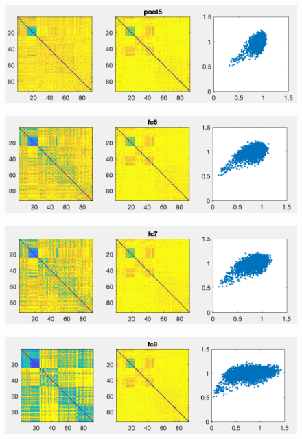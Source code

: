 \documentclass[]{article}
\begin{document}
\begin{figure}[H]
    \centering
    \includegraphics[width=0.7\linewidth]{problem2E_RDMpool5.png}
    \label{fig:my_label}
\end{figure}

\begin{figure}[H]
    \centering
    \includegraphics[width=0.7\linewidth]{problem2E_RDMfc6.png}
    \label{fig:my_label}
\end{figure}

\begin{figure}[H]
    \centering
    \includegraphics[width=0.7\linewidth]{problem2E_RDMfc7.png}
    \label{fig:my_label}
\end{figure}

\begin{figure}[H]
    \centering
    \includegraphics[width=0.7\linewidth]{problem2E_RDMfc8.png}
    \label{fig:my_label}
\end{figure}
\end{document}

